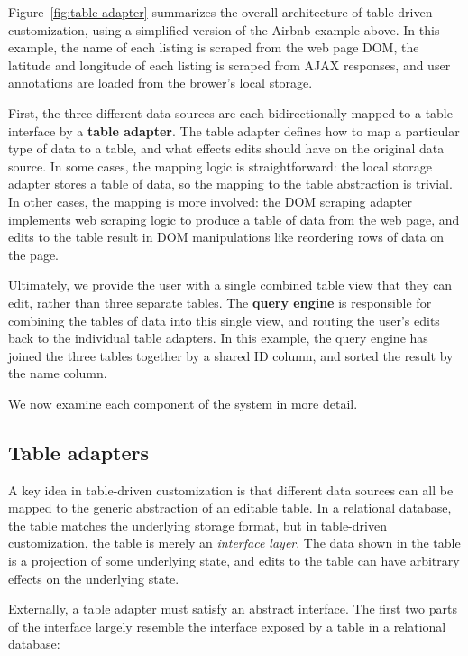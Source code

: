 \documentclass[sigplan,10pt,anonymous,review]{acmart}
\begin{document}
Figure~\ref{fig:table-adapter} summarizes the overall architecture of
table-driven customization, using a simplified version of the Airbnb
example above. In this example, the name of each listing is scraped from
the web page DOM, the latitude and longitude of each listing is scraped
from AJAX responses, and user annotations are loaded from the brower's
local storage.

First, the three different data sources are each bidirectionally mapped
to a table interface by a \textbf{table adapter}. The table adapter
defines how to map a particular type of data to a table, and what
effects edits should have on the original data source. In some cases,
the mapping logic is straightforward: the local storage adapter stores a
table of data, so the mapping to the table abstraction is trivial. In
other cases, the mapping is more involved: the DOM scraping adapter
implements web scraping logic to produce a table of data from the web
page, and edits to the table result in DOM manipulations like reordering
rows of data on the page.

Ultimately, we provide the user with a single combined table view that
they can edit, rather than three separate tables. The \textbf{query
engine} is responsible for combining the tables of data into this single
view, and routing the user's edits back to the individual table
adapters. In this example, the query engine has joined the three tables
together by a shared ID column, and sorted the result by the name
column.

We now examine each component of the system in more detail.

\hypertarget{table-adapters}{%
\subsection{Table adapters}\label{table-adapters}}

A key idea in table-driven customization is that different data sources
can all be mapped to the generic abstraction of an editable table. In a
relational database, the table matches the underlying storage format,
but in table-driven customization, the table is merely an
\emph{interface layer}. The data shown in the table is a projection of
some underlying state, and edits to the table can have arbitrary effects
on the underlying state.

Externally, a table adapter must satisfy an abstract interface. The
first two parts of the interface largely resemble the interface exposed
by a table in a relational database:
\end{document}
